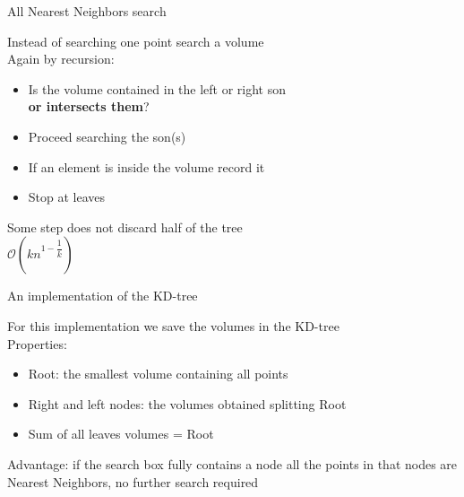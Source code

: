 \documentclass{beamer}
\begin{document}
\begin{frame}{All Nearest Neighbors search}
\begin{center}
Instead of searching one point search a volume\\
\vspace{0.5cm}
Again by recursion:
\begin{itemize}
\item Is the volume contained in the left or right son\\ \textbf{or intersects them}?
\item Proceed searching the son(s)
\item If an element is inside the volume record it
\item Stop at leaves
\end{itemize}
\vspace{1cm}
Some step does not discard half of the tree\\
\vspace{0.5cm}
$\mathcal{O}(k n ^{1-\dfrac{1}{k}})$
\end{center}
\end{frame}

\begin{frame}{An implementation of the KD-tree}
\begin{center}
For this implementation we save the volumes in the KD-tree\\
\vspace{0.5cm}
Properties:
\begin{itemize}
\item Root: the smallest volume containing all points
\item Right and left nodes: the volumes obtained splitting Root
\item Sum of all leaves volumes = Root
\end{itemize}
\vspace{0.5cm}
Advantage: if the search box fully contains a node all the points in that nodes are Nearest Neighbors, no further search required
\end{center}
\end{frame}
\end{document}
